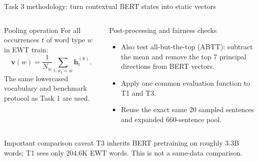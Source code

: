 \documentclass[aspectratio=169,9pt]{beamer}
\newcommand{\tightitem}{\setlength{\itemsep}{0.14em}\setlength{\parskip}{0pt}}
\begin{document}
\begin{frame}{Task 3 methodology: turn contextual BERT states into static vectors}
\begin{center}
\end{center}
\vspace{0.25em}
\begin{columns}[T,onlytextwidth]
  \begin{block}{Pooling operation}
    For all occurrences $t$ of word type $w$ in EWT train:
    \[
      \mathbf{v}(w)=\frac{1}{N_w}\sum_{t:w_t=w}\mathbf{h}^{(8)}_t.
    \]
    The same lowercased vocabulary and benchmark protocol as Task 1 are used.
  \end{block}
  \begin{block}{Post-processing and fairness checks}
    \begin{itemize}\tightitem
      \item Also test all-but-the-top (ABTT): subtract the mean and remove the top 7 principal directions from BERT vectors.
      \item Apply one common evaluation function to T1 and T3.
      \item Reuse the exact same 20 sampled sentences and expanded 660-sentence pool.
    \end{itemize}
  \end{block}
\end{columns}
\begin{alertblock}{Important comparison caveat}
T3 inherits BERT pretraining on roughly 3.3B words; T1 sees only 204.6K EWT words. This is not a same-data comparison.
\end{alertblock}
\end{frame}
\end{document}
